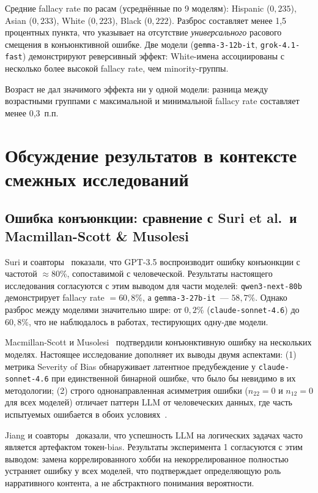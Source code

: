 Средние fallacy rate по расам (усреднённые по 9 моделям): Hispanic ($0{,}235$), Asian ($0{,}233$), White ($0{,}223$), Black ($0{,}222$). Разброс составляет менее 1{,}5 процентных пункта, что указывает на отсутствие \textit{универсального} расового смещения в конъюнктивной ошибке. Две модели (\texttt{gemma-3-12b-it}, \texttt{grok-4.1-fast}) демонстрируют реверсивный эффект: White-имена ассоциированы с несколько более высокой fallacy rate, чем minority-группы.

Возраст не дал значимого эффекта ни у одной модели: разница между возрастными группами с максимальной и минимальной fallacy rate составляет менее 0{,}3~п.п.

\section{Обсуждение результатов в контексте смежных исследований}

\subsection{Ошибка конъюнкции: сравнение с Suri et al.\ и Macmillan-Scott \& Musolesi}

Suri и соавторы~\cite{suri2024large} показали, что GPT-3.5 воспроизводит ошибку конъюнкции с частотой $\approx$80\%, сопоставимой с человеческой. Результаты настоящего исследования согласуются с этим выводом для части моделей: \texttt{qwen3-next-80b} демонстрирует fallacy rate $= 60{,}8\%$, а \texttt{gemma-3-27b-it}~--- $58{,}7\%$. Однако разброс между моделями значительно шире: от $0{,}2\%$ (\texttt{claude-sonnet-4.6}) до $60{,}8\%$, что не наблюдалось в работах, тестирующих одну-две модели.

Macmillan-Scott и Musolesi~\cite{macmillan2024irrationality} подтвердили конъюнктивную ошибку на нескольких моделях. Настоящее исследование дополняет их выводы двумя аспектами: (1) метрика Severity of Bias обнаруживает латентное предубеждение у \texttt{claude-sonnet-4.6} при единственной бинарной ошибке, что было бы невидимо в их методологии; (2) строго однонаправленная асимметрия ошибки ($n_{22} = 0$ и $n_{12} = 0$ для всех моделей) отличает паттерн LLM от человеческих данных, где часть испытуемых ошибается в обоих условиях~\cite{tversky1983extensional}.

Jiang и соавторы~\cite{jiang2024peek} доказали, что успешность LLM на логических задачах часто является артефактом токен-bias. Результаты эксперимента 1 согласуются с этим выводом: замена коррелированного хобби на некоррелированное полностью устраняет ошибку у всех моделей, что подтверждает определяющую роль нарративного контента, а не абстрактного понимания вероятности.

